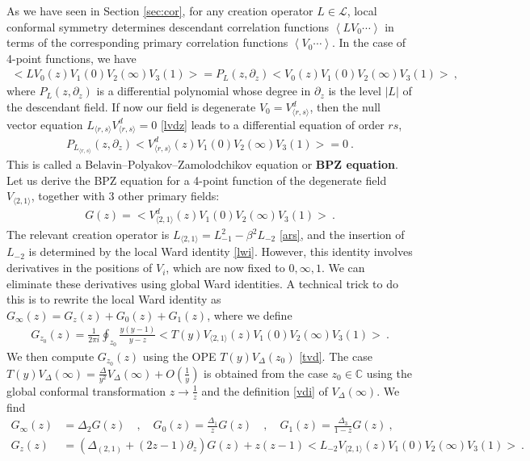 \documentclass[12pt, a4paper]{article}
\newcommand{\myindex}[1]{\textbf{\boldmath #1}}
\begin{document}
As we have seen in Section \ref{sec:cor}, for any creation operator $L\in\mathcal{L}$, local conformal symmetry determines descendant correlation functions $\left<LV_0\cdots \right>$ in terms of the corresponding primary correlation functions $\left<V_0\cdots \right>$.
In the case of 4-point functions, we have 
\begin{align}
 \Big<LV_0(z)V_1(0)V_2(\infty)V_3(1)\Big> = P_L(z,\partial_z) \Big<V_0(z)V_1(0)V_2(\infty)V_3(1)\Big>\ ,
\end{align}
where $P_L(z,\partial_z)$ is a differential polynomial whose degree in $\partial_z$ is the level $|L|$ of the descendant field. If now our field is degenerate $V_0= V^d_{\langle r,s\rangle}$, then the null vector equation $L_{\langle r,s\rangle}V^d_{\langle r,s\rangle}=0$ \eqref{lvdz} leads to a differential equation of order $rs$,
\begin{align}
 P_{L_{\langle r,s\rangle}}(z,\partial_z) \Big<V^d_{\langle r,s\rangle}(z)V_1(0)V_2(\infty)V_3(1)\Big> = 0\ .
\end{align}
This is called a Belavin--Polyakov--Zamolodchikov equation or \myindex{BPZ equation}.  
Let us derive the BPZ equation for a 4-point function  of the degenerate field $V_{\langle 2,1\rangle}$, together with 3 other primary fields:
\begin{align}
 G(z)=\Big<V_{\langle 2,1\rangle}^d(z)V_{1}(0)V_{2}(\infty)V_{3}(1)\Big>\ .
 \label{goz}
\end{align}
The relevant creation operator is $L_{\langle 2,1\rangle} = L_{-1}^2 -\beta^2L_{-2}$ \eqref{ars}, and the insertion of $L_{-2}$ is determined by the local Ward identity \eqref{lwi}. However, this identity involves derivatives in the positions of $V_{i}$, which are now fixed to $0,\infty,1$. We can eliminate these derivatives using global Ward identities. A technical trick to do this is to rewrite the local Ward identity as $G_\infty(z) = G_{z}(z) + G_0(z) + G_1(z)$, where we define
\begin{align}
 G_{z_0}(z) = \frac{1}{2\pi i} \oint_{z_0} \frac{y(y-1)}{y-z} \Big< T(y)V_{\langle 2,1\rangle}(z)V_{1}(0)V_{2}(\infty)V_{3}(1)\Big> \ .
\end{align}
We then compute $G_{z_0}(z)$ using the OPE $T(y)V_\Delta(z_0)$ \eqref{tvd}. The case $T(y)V_\Delta(\infty) = \frac{\Delta}{y^2} V_\Delta(\infty) + O(\frac{1}{y})$ is obtained from the case $z_0\in\mathbb{C}$ using the global conformal transformation $z\to \frac{1}{z}$ and the definition \eqref{vdi} of $V_\Delta(\infty)$. We find 
\begin{subequations}
\begin{align}
 G_\infty(z) &= \Delta_2 G(z) \quad , \quad G_0(z) = \frac{\Delta_1}{z}G(z)\quad , \quad G_1(z) = \frac{\Delta_3}{1-z}G(z)\ ,
 \\
 G_z(z) &= \left(\Delta_{(2,1)} + (2z-1)\partial_z\right) G(z) + z(z-1)\Big<L_{-2}V_{\langle 2,1\rangle}(z)V_{1}(0)V_{2}(\infty)V_{3}(1)\Big>
 \ .
\end{align}
\end{subequations}
\end{document}
